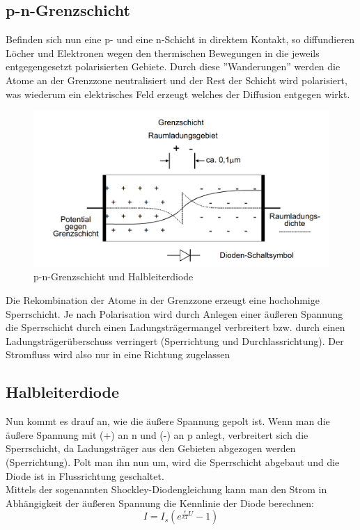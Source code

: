\documentclass{article}
\begin{document}
\subsection{p-n-Grenzschicht}
Befinden sich nun eine p- und eine n-Schicht in direktem Kontakt, so diffundieren Löcher und Elektronen wegen den thermischen Bewegungen in die jeweils entgegengesetzt polarisierten Gebiete. Durch diese ''Wanderungen'' werden die Atome an der Grenzzone neutralisiert und der Rest der Schicht wird polarisiert, was wiederum ein elektrisches Feld erzeugt welches der Diffusion entgegen wirkt.
\begin{figure}[H]
\includegraphics[width=\textwidth]{bilder/tra3}
\caption{p-n-Grenzschicht und Halbleiterdiode}
\end{figure}

Die Rekombination der Atome in der Grenzzone erzeugt eine hochohmige Sperrschicht. Je nach Polarisation wird durch Anlegen einer äußeren Spannung die Sperrschicht durch einen Ladungsträgermangel verbreitert bzw. durch einen Ladungsträgerüberschuss verringert (Sperrichtung und Durchlassrichtung). Der Stromfluss wird also nur in eine Richtung zugelassen

\subsection{Halbleiterdiode}
Nun kommt es drauf an, wie die äußere Spannung gepolt ist. Wenn man die äußere Spannung mit (+) an n und (-) an p anlegt, verbreitert sich die Sperrschicht, da Ladungsträger aus den Gebieten abgezogen werden (Sperrichtung). Polt man ihn nun um, wird die Sperrschicht abgebaut und die Diode ist in Flussrichtung geschaltet.\\
Mittels der sogenannten Shockley-Diodengleichung kann man den Strom in Abhängigkeit der äußeren Spannung die Kennlinie der Diode berechnen:
\begin{equation}
I=I_s \left(e^{\frac{e}{kT}U}-1\right)
\end{equation}
\end{document}

